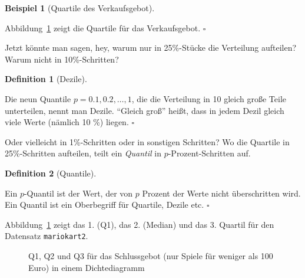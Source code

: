 \documentclass[
  letterpaper,
  twoside,
  open=any]{scrbook}
\theoremstyle{definition}
\newtheorem{definition}{Definition}[chapter]
\theoremstyle{definition}
\theoremstyle{definition}
\newtheorem{example}{Beispiel}[chapter]
\theoremstyle{remark}
\begin{document}
\begin{example}[Quartile des
Verkaufsgebot]\protect\hypertarget{exm-mario-qs}{}\label{exm-mario-qs}

Abbildung~\ref{fig-mario-qs1} zeigt die Quartile für das Verkaufsgebot.
\(\square\)

\end{example}

Jetzt könnte man sagen, hey, warum nur in 25\%-Stücke die Verteilung
aufteilen? Warum nicht in 10\%-Schritten?

\begin{definition}[Dezile]\protect\hypertarget{def-dezile}{}\label{def-dezile}

Die neun Quantile \(p= 0.1, 0.2, \ldots, 1\), die die Verteilung in 10
gleich große Teile unterteilen, nennt man Dezile. \enquote{Gleich groß}
heißt, dass in jedem Dezil gleich viele Werte (nämlich 10 \%) liegen.
\(\square\)

\end{definition}

Oder vielleicht in 1\%-Schritten oder in sonstigen Schritten? Wo die
Quartile in 25\%-Schritten aufteilen, teilt ein \emph{Quantil} in
\(p\)-Prozent-Schritten auf.

\begin{definition}[Quantile]\protect\hypertarget{def-quantile}{}\label{def-quantile}

Ein \(p\)-Quantil ist der Wert, der von \(p\) Prozent der Werte nicht
überschritten wird. Ein Quantil ist ein Oberbegriff für Quartile, Dezile
etc. \(\square\)

\end{definition}

Abbildung~\ref{fig-mario-qs1} zeigt das 1. (Q1), das 2. (Median) und das
3. Quartil für den Datensatz \texttt{mariokart2}.

\begin{figure}


\caption{\label{fig-mario-qs1}Q1, Q2 und Q3 für das Schlussgebot (nur
Spiele für weniger als 100 Euro) in einem Dichtediagramm}

\end{figure}%
\end{document}
